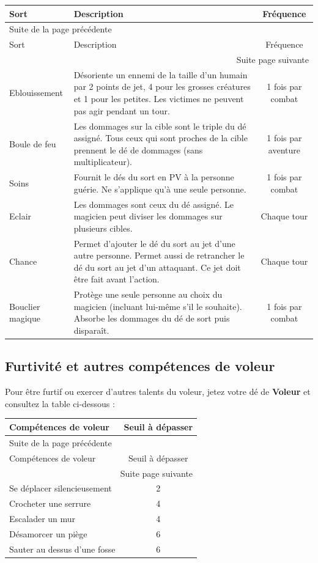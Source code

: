 \documentclass[a4paper, 11pt, twoside]{article}
\begin{document}
\begin{longtable}{l|p{10cm}|c}
Sort & Description & Fréquence\\
\hline
\endfirsthead
\multicolumn{3}{l}{Suite de la page précédente} \\
\hline

Sort & Description & Fréquence \\

\hline
\endhead
\hline\multicolumn{3}{r}{Suite page suivante} \\
\endfoot
\endlastfoot
\hline
Eblouissement & Désoriente un ennemi de la taille d'un humain par 2 points de jet, 4 pour les grosses créatures et 1 pour les petites. Les victimes ne peuvent pas agir pendant un tour. & 1 fois par combat\\
Boule de feu & Les dommages sur la cible sont le triple du dé assigné. Tous ceux qui sont proches de la cible prennent le dé de dommages (sans multiplicateur). & 1 fois par aventure\\
Soins & Fournit le dés du sort en PV à la personne guérie. Ne s'applique qu'à une seule personne. & 1 fois par combat\\
Eclair & Les dommages sont ceux du dé assigné. Le magicien peut diviser les dommages sur plusieurs cibles. & Chaque tour\\
Chance & Permet d'ajouter le dé du sort au jet d'une autre personne. Permet aussi de retrancher le dé du sort au jet d'un attaquant. Ce jet doit être fait avant l'action. & Chaque tour\\
Bouclier magique & Protège une seule personne au choix du magicien (incluant lui-même s'il le souhaite). Absorbe les dommages du dé de sort puis disparaît. & 1 fois par combat\\
\end{longtable}

\subsection{Furtivité et autres compétences de voleur}
\label{sec:org16c5070}

Pour être furtif ou exercer d'autres talents du voleur, jetez votre dé de \textbf{Voleur} et consultez la table ci-dessous :

\begin{longtable}{l|c}
Compétences de voleur & Seuil à dépasser\\
\hline
\endfirsthead
\multicolumn{2}{l}{Suite de la page précédente} \\
\hline

Compétences de voleur & Seuil à dépasser \\

\hline
\endhead
\hline\multicolumn{2}{r}{Suite page suivante} \\
\endfoot
\endlastfoot
\hline
Se déplacer silencieusement & 2\\
Crocheter une serrure & 4\\
Escalader un mur & 4\\
Désamorcer un piège & 6\\
Sauter au dessus d'une fosse & 6\\
\end{longtable}
\end{document}
